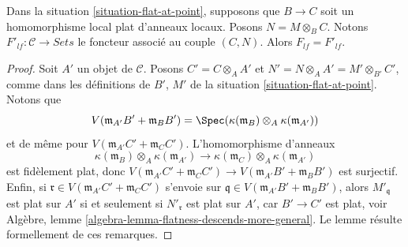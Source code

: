 \begin{lemma}
\label{lemma-flat-at-point-go-up}
Dans la
situation \ref{situation-flat-at-point},
supposons que $B \to C$ soit un homomorphisme local plat d'anneaux
locaux. Posons $N = M \otimes_B C$. Notons
$F'_{lf} : \mathcal{C} \to \textit{Sets}$ le foncteur associé
au couple $(C, N)$. Alors $F_{lf} = F'_{lf}$.
\end{lemma}

\begin{proof}
Soit $A'$ un objet de $\mathcal{C}$. Posons $C' = C \otimes_A A'$
et $N' = N \otimes_A A' = M' \otimes_{B'} C'$, comme dans les définitions
de $B'$, $M'$ de la
situation \ref{situation-flat-at-point}. Notons que
$$
V(\mathfrak m_{A'}B' + \mathfrak m_B B')
=
\Spec( \kappa(\mathfrak m_B) \otimes_A \kappa(\mathfrak m_{A'}) )
$$
et de même pour $V(\mathfrak m_{A'}C' + \mathfrak m_C C')$.
L'homomorphisme d'anneaux
$$
\kappa(\mathfrak m_B) \otimes_A \kappa(\mathfrak m_{A'})
\longrightarrow
\kappa(\mathfrak m_C) \otimes_A \kappa(\mathfrak m_{A'})
$$
est fidèlement plat, donc
$V(\mathfrak m_{A'}C' + \mathfrak m_C C') \to
V(\mathfrak m_{A'}B' + \mathfrak m_B B')$ est surjectif.
Enfin, si $\mathfrak r \in V(\mathfrak m_{A'}C' + \mathfrak m_C C')$
s'envoie sur $\mathfrak q \in V(\mathfrak m_{A'}B' + \mathfrak m_B B')$, alors
$M'_{\mathfrak q}$ est plat sur $A'$ si et seulement si
$N'_{\mathfrak r}$ est plat sur $A'$, car $B' \to C'$ est plat, voir
Algèbre, lemme \ref{algebra-lemma-flatness-descends-more-general}.
Le lemme résulte formellement de ces remarques.
\end{proof}

